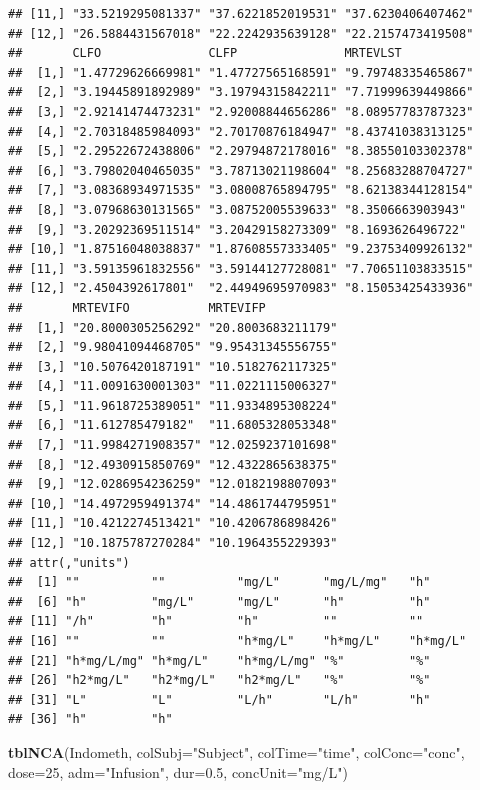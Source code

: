 \documentclass[]{krantz}
\makeatletter
\newenvironment{Shaded}{\begin{snugshade}}{\end{snugshade}}
\newcommand{\KeywordTok}[1]{\textcolor[rgb]{0.13,0.29,0.53}{\textbf{#1}}}
\newcommand{\DataTypeTok}[1]{\textcolor[rgb]{0.13,0.29,0.53}{#1}}
\newcommand{\DecValTok}[1]{\textcolor[rgb]{0.00,0.00,0.81}{#1}}
\newcommand{\FloatTok}[1]{\textcolor[rgb]{0.00,0.00,0.81}{#1}}
\newcommand{\StringTok}[1]{\textcolor[rgb]{0.31,0.60,0.02}{#1}}
\newcommand{\NormalTok}[1]{#1}
\newenvironment{kframe}{%
\medskip{}
\setlength{\fboxsep}{.8em}
 \def\at@end@of@kframe{}%
 \ifinner\ifhmode%
  \def\at@end@of@kframe{\end{minipage}}%
  \begin{minipage}{\columnwidth}%
 \fi\fi%
 \def\FrameCommand##1{\hskip\@totalleftmargin \hskip-\fboxsep
 \colorbox{shadecolor}{##1}\hskip-\fboxsep
     \hskip-\linewidth \hskip-\@totalleftmargin \hskip\columnwidth}%
 \MakeFramed {\advance\hsize-\width
   \@totalleftmargin\z@ \linewidth\hsize
   \@setminipage}}%
 {\par\unskip\endMakeFramed%
 \at@end@of@kframe}
\renewenvironment{Shaded}{\begin{kframe}}{\end{kframe}}
\theoremstyle{definition}
\theoremstyle{definition}
\theoremstyle{definition}
\theoremstyle{remark}
\makeatother
\begin{document}
\begin{verbatim}
## [11,] "33.5219295081337" "37.6221852019531" "37.6230406407462"
## [12,] "26.5884431567018" "22.2242935639128" "22.2157473419508"
##       CLFO               CLFP               MRTEVLST          
##  [1,] "1.47729626669981" "1.47727565168591" "9.79748335465867"
##  [2,] "3.19445891892989" "3.19794315842211" "7.71999639449866"
##  [3,] "2.92141474473231" "2.92008844656286" "8.08957783787323"
##  [4,] "2.70318485984093" "2.70170876184947" "8.43741038313125"
##  [5,] "2.29522672438806" "2.29794872178016" "8.38550103302378"
##  [6,] "3.79802040465035" "3.78713021198604" "8.25683288704727"
##  [7,] "3.08368934971535" "3.08008765894795" "8.62138344128154"
##  [8,] "3.07968630131565" "3.08752005539633" "8.3506663903943" 
##  [9,] "3.20292369511514" "3.20429158273309" "8.1693626496722" 
## [10,] "1.87516048038837" "1.87608557333405" "9.23753409926132"
## [11,] "3.59135961832556" "3.59144127728081" "7.70651103833515"
## [12,] "2.4504392617801"  "2.44949695970983" "8.15053425433936"
##       MRTEVIFO           MRTEVIFP          
##  [1,] "20.8000305256292" "20.8003683211179"
##  [2,] "9.98041094468705" "9.95431345556755"
##  [3,] "10.5076420187191" "10.5182762117325"
##  [4,] "11.0091630001303" "11.0221115006327"
##  [5,] "11.9618725389051" "11.9334895308224"
##  [6,] "11.612785479182"  "11.6805328053348"
##  [7,] "11.9984271908357" "12.0259237101698"
##  [8,] "12.4930915850769" "12.4322865638375"
##  [9,] "12.0286954236259" "12.0182198807093"
## [10,] "14.4972959491374" "14.4861744795951"
## [11,] "10.4212274513421" "10.4206786898426"
## [12,] "10.1875787270284" "10.1964355229393"
## attr(,"units")
##  [1] ""          ""          "mg/L"      "mg/L/mg"   "h"        
##  [6] "h"         "mg/L"      "mg/L"      "h"         "h"        
## [11] "/h"        "h"         "h"         ""          ""         
## [16] ""          ""          "h*mg/L"    "h*mg/L"    "h*mg/L"   
## [21] "h*mg/L/mg" "h*mg/L"    "h*mg/L/mg" "%"         "%"        
## [26] "h2*mg/L"   "h2*mg/L"   "h2*mg/L"   "%"         "%"        
## [31] "L"         "L"         "L/h"       "L/h"       "h"        
## [36] "h"         "h"
\end{verbatim}

\begin{Shaded}
\begin{Highlighting}[]
\KeywordTok{tblNCA}\NormalTok{(Indometh, }\DataTypeTok{colSubj=}\StringTok{"Subject"}\NormalTok{, }\DataTypeTok{colTime=}\StringTok{"time"}\NormalTok{, }\DataTypeTok{colConc=}\StringTok{"conc"}\NormalTok{, }\DataTypeTok{dose=}\DecValTok{25}\NormalTok{,}
       \DataTypeTok{adm=}\StringTok{"Infusion"}\NormalTok{, }\DataTypeTok{dur=}\FloatTok{0.5}\NormalTok{, }\DataTypeTok{concUnit=}\StringTok{"mg/L"}\NormalTok{)}
\end{Highlighting}
\end{Shaded}
\end{document}
